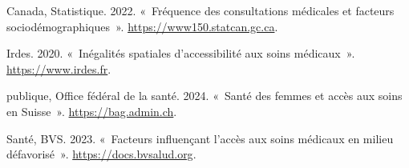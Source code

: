 \documentclass[
]{article}
\newlength{\cslhangindent}
\newenvironment{CSLReferences}[2] %
 {\begin{list}{}{%
  \setlength{\itemindent}{0pt}
  \setlength{\leftmargin}{0pt}
  \setlength{\parsep}{0pt}
  \ifodd #1
   \setlength{\leftmargin}{\cslhangindent}
   \setlength{\itemindent}{-1\cslhangindent}
  \fi
  \setlength{\itemsep}{#2\baselineskip}}}
 {\end{list}}
\begin{document}
\label{refs}
\begin{CSLReferences}{1}{0}
Canada, Statistique. 2022. {«~Fréquence des consultations médicales et
facteurs sociodémographiques~»}. \url{https://www150.statcan.gc.ca}.

Irdes. 2020. {«~Inégalités spatiales d'accessibilité aux soins
médicaux~»}. \url{https://www.irdes.fr}.

publique, Office fédéral de la santé. 2024. {«~Santé des femmes et accès
aux soins en Suisse~»}. \url{https://bag.admin.ch}.

Santé, BVS. 2023. {«~Facteurs influençant l'accès aux soins médicaux en
milieu défavorisé~»}. \url{https://docs.bvsalud.org}.

\end{CSLReferences}
\end{document}
